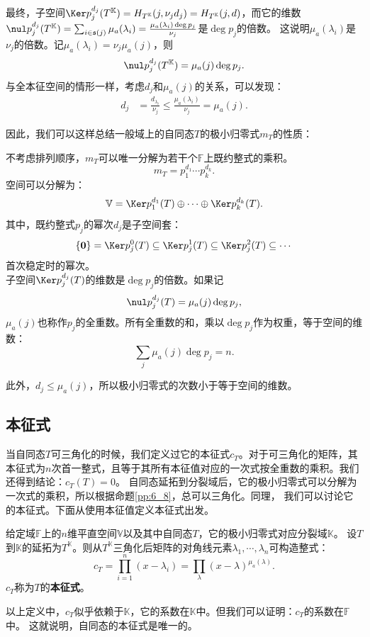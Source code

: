\documentclass[12pt,UTF8,fontset=none]{ctexbook}
\begin{document}
最终，子空间$\Ker p_j^{d_j}(T^{\mathbb{K}}) = H_{T^{\mathbb{K}}}(j, \nu_j d_j) = H_{T^{\mathbb{K}}}(j, d)$，而它的维数
$\nul p_j^{d_j}(T^{\mathbb{K}}) = \sum_{i\in \mathfrak{s}(j)} \mu_a(\lambda_i) = \frac{\mu_a(\lambda_i) \deg p_j}{\nu_j} $是$\deg p_j$的倍数。
这说明$\mu_a(\lambda_i)$是$\nu_j$的倍数。记$\mu_a(\lambda_i) = \nu_j \mu_a(j)$，则
$$ \nul p_j^{d_j}(T^{\mathbb{K}}) = \mu_a(j) \deg p_j. $$
与全本征空间的情形一样，考虑$d_j$和$\mu_a(j)$的关系，可以发现：
\begin{align*}
    d_j &= \frac{d_{\lambda_i}}{\nu_j} \leqslant \frac{\mu_a(\lambda_i)}{\nu_j} = \mu_a(j).  
\end{align*}

因此，我们可以这样总结一般域上的自同态$T$的极小归零式$m_T$的性质：
\begin{pp}\label{pp:9_7_1}
不考虑排列顺序，$m_T$可以唯一分解为若干个$\mathbb{F}$上既约整式的乘积。
$$ m_T = p_1^{d_1}\cdots p_k^{d_k}.$$
空间可以分解为：
$$ \mathbb{V} = \Ker p_1^{d_1}(T) \oplus \cdots \oplus \Ker p_k^{d_k}(T). $$
其中，既约整式$p_j$的幂次$d_j$是子空间套：
$$ \{\mathbf{0}\} = \Ker p_j^{0}(T) \subseteq \Ker p_j^{1}(T) \subseteq \Ker p_j^{2}(T) \subseteq \cdots $$
首次稳定时的幂次。\\
子空间$\Ker p_j^{d_j}(T)$的维数是$\deg p_j$的倍数。如果记
$$ \nul p_j^{d_j}(T) = \mu_a(j) \deg p_j, $$
$\mu_a(j)$也称作$p_j$的全重数。所有全重数的和，乘以$\deg p_j$作为权重，等于空间的维数：
$$ \sum_j \mu_a(j) \deg p_j = n . $$
\end{pp}

此外，$d_j  \leqslant \mu_a(j) $，所以极小归零式的次数小于等于空间的维数。

\subsection{本征式}
当自同态$T$可三角化的时候，我们定义过它的本征式$c_T$。对于可三角化的矩阵，其本征式为$n$次首一整式，且等于其所有本征值对应的一次式按全重数的乘积。我们还得到结论：$c_T(T) = 0$。
自同态延拓到分裂域后，它的极小归零式可以分解为一次式的乘积，所以根据命题\ref{pp:6_8}，总可以三角化。同理，
我们可以讨论它的本征式。下面从使用本征值定义本征式出发。

\begin{df}\label{df:9_5}
    给定域$\mathbb{F}$上的$n$维平直空间$\mathbb{V}$以及其中自同态$T$，它的极小归零式对应分裂域$\mathbb{K}$。
    设$T$到$\mathbb{K}$的延拓为$T^{\mathbb{K}}$。则从$T^{\mathbb{K}}$三角化后矩阵的对角线元素$\lambda_1, \cdots , \lambda_n$可构造整式：
    $$ c_T = \prod_{i=1}^n (x - \lambda_i) = \prod_{\lambda} (x - \lambda)^{\mu_a(\lambda)}.$$
    $c_T$称为$T$的\textbf{本征式}。
\end{df}
以上定义中，$c_T$似乎依赖于$\mathbb{K}$，它的系数在$\mathbb{K}$中。但我们可以证明：$c_T$的系数在$\mathbb{F}$中。
这就说明，自同态的本征式是唯一的。
\end{document}
